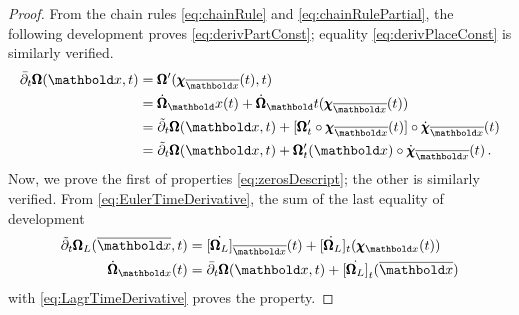 {\footnotesize
\begin{proof}
From the chain rules \eqref{eq:chainRule} and \eqref{eq:chainRulePartial}, the following development proves \eqref{eq:derivPartConst}; equality \eqref{eq:derivPlaceConst} is similarly verified.
\begin{align*}
\bar{\partial}_t\tnr{\Omega}({\vto{x}},t)&=\tnr{\Omega}'(\fua{\tnr{\chi}_{\overline{\vto{x}}}}{t},t)\\
&=\dot{\tnr{\Omega}}_\vto{x}(t)+\dot{\tnr{\Omega}}_\vto{t}(\fua{\tnr{\chi}_{\overline{\vto{x}}}}{t}) \\
&=\tilde{\partial}_t\tnr{\Omega}({\vto{x}},t)+[\tnr{\Omega}_t'\circ\fua{\tnr{\chi}_{\overline{\vto{x}}}}{t}]\circ\fua{\dot{\tnr{\chi}}_{\overline{\vto{x}}}}{t}\\
&=\tilde{\partial}_t\tnr{\Omega}({\vto{x}},t)+\tnr{\Omega}_t'(\vto{x})\circ\fua{\dot{\tnr{\chi}}_{\overline{\vto{x}}}}{t}\,.
\end{align*}
Now, we prove the first of properties \eqref{eq:zerosDescript}; the other is similarly verified. From \eqref{eq:EulerTimeDerivative}, the sum of the last equality of development  
\begin{align*}
\tilde{\partial}_t\tnr{\Omega}_L(\overline{\vto{x}},t)&=\dot{[\tnr{\Omega}_L]}_{\overline{\vto{x}}}(t)+\dot{[\tnr{\Omega}_L}]_{t}(\tnr{\chi}_{{\vto{x}}}(t))\\
\dot{\tnr{\Omega}}_{\vto{x}}(t)&=\bar{\partial}_t\tnr{\Omega}({\vto{x}},t)+\dot{[\tnr{\Omega}_L]}_{t}(\overline{\vto{x}})
\end{align*}
with \eqref{eq:LagrTimeDerivative} proves the property.  
\end{proof}
}


